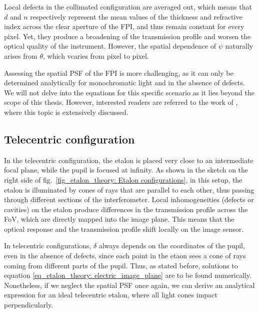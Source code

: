 Local defects in the collimated configuration are averaged out, which means that $d$ and $n$ respectively represent the mean values of the thickness and refractive index across the clear aperture of the FPI, and thus remain constant for every pixel. Yet, they produce a broadening of the transmission profile and worsen the optical quality of the instrument. However, the spatial dependence of $\psi$ naturally arises from $\theta$, which vcaries from pixel to pixel. 

Assessing the spatial PSF of the FPI is more challenging, as it can only be determined analytically for monochromatic light and in the absence of defects. We will not delve into the equations for this specific scenario as it lies beyond the scope of this thesis. However, interested readers are referred to the work of \cite{franI}, where this topic is extensively discussed.

\subsection{\label{susec_etalon_theory: Tele-perfe}Telecentric configuration}

In the telecentric configuration, the etalon is placed very close to an intermediate focal plane, while the pupil is focused at infinity. As shown in the sketch on the right side of fig.~{\ref{fig_etalon_theory: Etalon configurations}}, in this setup, the etalon is illuminated by cones of rays that are parallel to each other, thus passing through different sections of the interferometer. Local inhomogeneities (defects or cavities) on the etalon produce differences in the transmission profile across the FoV, which are directly mapped into the image plane. This means that the optical response and the transmission profile shift locally on the image sensor. 

In telecentric configurations, $\delta$ always depends on the coordinates of the pupil, even in the absence of defects, since each point in the etaon sees a cone of rays coming from different parts of the pupil. Thus, as stated before, solutions to equation \eqref{eq_etalon_theory: electric_image_plane} are to be found numerically. Nonetheless, if we neglect the spatial PSF once again, we can derive an analytical expression for an ideal telecentric etalon, where all light cones impact perpendicularly.

